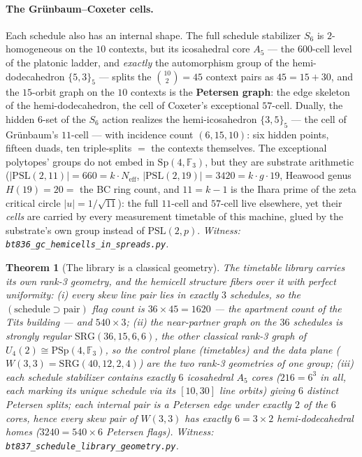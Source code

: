 \documentclass[11pt]{article}
\newtheorem{theorem}{Theorem}[section]
\newcommand{\W}{W(3,3)}
\newcommand{\GF}[1]{\mathbb{F}_{#1}}
\newcommand{\Sp}{\mathrm{Sp}}
\newcommand{\PSp}{\mathrm{PSp}}
\begin{document}
\paragraph{The Gr\"unbaum--Coxeter cells.}
Each schedule also has an internal shape.  The full schedule
stabilizer $S_6$ is $2$-homogeneous on the $10$ contexts, but its
icosahedral core $A_5$ --- the $600$-cell level of the platonic
ladder, and \emph{exactly} the automorphism group of the
hemi-dodecahedron $\{5,3\}_5$ --- splits the $\binom{10}{2}=45$
context pairs as $45=15+30$, and the $15$-orbit graph on the $10$
contexts is the \textbf{Petersen graph}: the edge skeleton of the
hemi-dodecahedron, the cell of Coxeter's exceptional $57$-cell.
Dually, the hidden $6$-set of the $S_6$ action realizes the
hemi-icosahedron $\{3,5\}_5$ --- the cell of Gr\"unbaum's $11$-cell
--- with incidence count $(6,15,10)$: six hidden points, fifteen
duads, ten triple-splits $=$ the contexts themselves.  The exceptional
polytopes' groups do not embed in $\Sp(4,\GF3)$, but they are
substrate arithmetic
($|\mathrm{PSL}(2,11)|=660=k\cdot N_{\mathrm{eff}}$,
$|\mathrm{PSL}(2,19)|=3420=k\cdot g\cdot 19$, Heawood genus
$H(19)=20=$ the BC ring count, and $11=k-1$ is the Ihara prime of the
zeta critical circle $|u|=1/\sqrt{11}$): the full $11$-cell and
$57$-cell live elsewhere, yet their \emph{cells} are carried by every
measurement timetable of this machine, glued by the substrate's own
group instead of $\mathrm{PSL}(2,p)$.
\emph{Witness: \texttt{bt836\_gc\_hemicells\_in\_spreads.py}.}

\begin{theorem}[The library is a classical geometry]
\label{thm:library}
The timetable library carries its own rank-3 geometry, and the
hemicell structure fibers over it with perfect uniformity:
(i) every skew line pair lies in exactly $3$ schedules, so the
$(\mathrm{schedule}\supset\mathrm{pair})$ flag count is
$36\times45=1620$ --- the apartment count of the Tits building ---
and $540\times3$;
(ii) the near-partner graph on the $36$ schedules is strongly regular
$\mathrm{SRG}(36,15,6,6)$, the \emph{other} classical rank-3 graph of
$U_4(2)\cong\PSp(4,\GF3)$, so the control plane (timetables) and the
data plane ($\W=\mathrm{SRG}(40,12,2,4)$) are the two rank-3
geometries of one group;
(iii) each schedule stabilizer contains exactly $6$ icosahedral
$A_5$ cores ($216=6^3$ in all, each marking its unique schedule via
its $[10,30]$ line orbits) giving $6$ distinct Petersen splits; each
internal pair is a Petersen edge under exactly $2$ of the $6$ cores,
hence every skew pair of $\W$ has exactly $6=3\times2$
hemi-dodecahedral homes ($3240=540\times6$ Petersen flags).
\emph{Witness: \texttt{bt837\_schedule\_library\_geometry.py}.}
\end{theorem}
\end{document}
